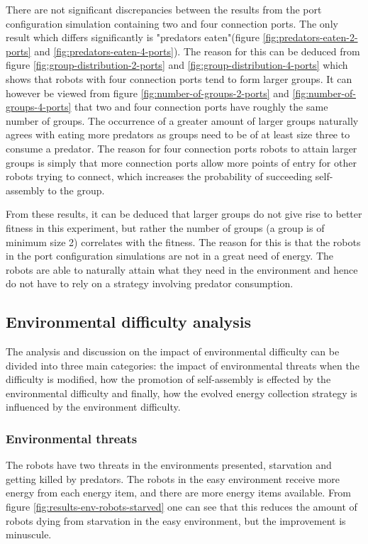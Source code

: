 There are not significant discrepancies between the results from the port configuration simulation containing two and four connection ports.
The only result which differs significantly is "predators eaten"(figure \ref{fig:predators-eaten-2-ports} and \ref{fig:predators-eaten-4-ports}).
The reason for this can be deduced from figure \ref{fig:group-distribution-2-ports} and \ref{fig:group-distribution-4-ports} which shows that robots with four connection ports tend to form larger groups.
It can however be viewed from figure \ref{fig:number-of-groups-2-ports} and \ref{fig:number-of-groups-4-ports} that two and four connection ports have roughly the same number of groups.
The occurrence of a greater amount of larger groups naturally agrees with eating more predators as groups need to be of at least size three to consume a predator.
The reason for four connection ports robots to attain larger groups is simply that more connection ports allow more points of entry for other robots trying to connect, which increases the probability of succeeding self-assembly to the group.

From these results, it can be deduced that larger groups do not give rise to better fitness in this experiment, but rather the number of groups (a group is of minimum size 2) correlates with the fitness.
The reason for this is that the robots in the port configuration simulations are not in a great need of energy.
The robots are able to naturally attain what they need in the environment and hence do not have to rely on a strategy involving predator consumption.

\subsection{Environmental difficulty analysis}
The analysis and discussion on the impact of environmental difficulty can be divided into three main categories: the impact of environmental threats when the difficulty is modified, how the promotion of self-assembly is effected by the environmental difficulty and finally, 
how the evolved energy collection strategy is influenced by the environment difficulty.    

\subsubsection{Environmental threats}
The robots have two threats in the environments presented, starvation and getting killed by predators.
The robots in the easy environment receive more energy from each energy item, and there are more energy items available.
From figure \ref{fig:results-env-robots-starved} one can see that this reduces the amount of robots dying from starvation in the easy environment, but the improvement is minuscule.

